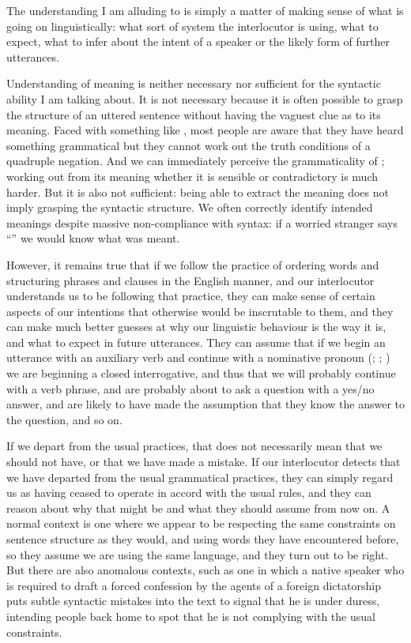 \documentclass[output=paper]{langscibook}
\begin{document}
The understanding I am alluding to is simply a matter of making sense of what is going on linguistically: what sort of system the interlocutor is using, what to expect, what to infer about the intent of a speaker or the likely form of further utterances.

Understanding of meaning is neither necessary nor sufficient for the syntactic ability I am talking about.  It is not necessary because it is often possible to grasp the structure of an uttered sentence without having the vaguest clue as to its meaning.  Faced with something like , most people are aware that they have heard something grammatical but they cannot work out the truth conditions of a quadruple negation.  And we can immediately perceive the grammaticality of ; working out from its meaning whether it is sensible or contradictory is much harder.  But it is also not sufficient: being able to extract the meaning does not imply grasping the syntactic structure.  We often correctly identify intended meanings despite massive non-compliance with syntax: if a worried stranger says ``'' we would know what was meant.

However, it remains true that if we follow the practice of ordering words and structuring phrases and clauses in the English manner, and our interlocutor understands us to be following that practice, they can make sense of certain aspects of our intentions that otherwise would be inscrutable to them, and they can make much better guesses at why our linguistic behaviour is the way it is, and what to expect in future utterances.  They can assume that if we begin an utterance with an auxiliary verb and continue with a nominative pronoun (; ; ) we are beginning a closed interrogative, and thus that we will probably continue with a verb phrase, and are probably about to ask a question with a yes/no answer, and are likely to have made the assumption that they know the answer to the question, and so on.

If we depart from the usual practices, that does not necessarily mean that we should not have, or that we have made a mistake.  If our interlocutor detects that we have departed from the usual grammatical practices, they can simply regard us as having ceased to operate in accord with the usual rules, and they can reason about why that might be and what they should assume from now on. A normal context is one where we appear to be respecting the same constraints on sentence structure as they would, and using words they have encountered before, so they assume we are using the same language, and they turn out to be right. But there are also anomalous contexts, such as one in which a native speaker who is required to draft a forced confession by the agents of a foreign dictatorship puts subtle syntactic mistakes into the text to signal that he is under duress, intending people back home to spot that he is not complying with the usual constraints.
\end{document}
